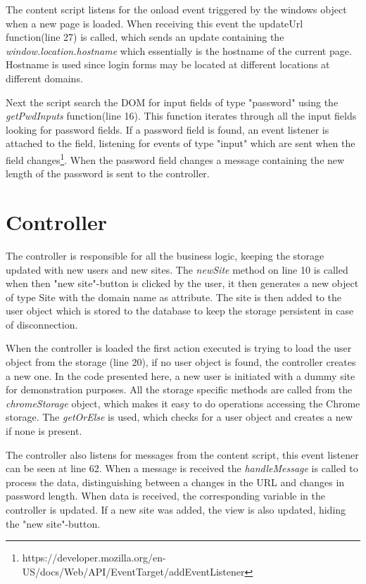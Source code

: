 The content script listens for the onload event triggered by the windows object when a new page is loaded. When receiving this event the updateUrl function(line 27) is called, which sends an update containing the \emph{window.location.hostname} which essentially is the hostname of the current page. Hostname is used since login forms may be located at different locations at different domains.
\par Next the script search the DOM for input fields of type "password" using the \emph{getPwdInputs} function(line 16). This function iterates through all the input fields looking for password fields. If a password field is found, an event listener is attached to the field, listening for events of type "input" which are sent when the field changes\footnote{https://developer.mozilla.org/en-US/docs/Web/API/EventTarget/addEventListener}. When the password field changes a message containing the new length of the password is sent to the controller. 

\section{Controller}\label{app:controller}

The controller is responsible for all the business logic, keeping the storage updated with new users and new sites. The \emph{newSite} method on line 10 is called when then "new site"-button is clicked by the user, it then generates a new object of type Site with the domain name as attribute. The site is then added to the user object which is stored to the database to keep the storage persistent in case of disconnection. 
\par When the controller is loaded the first action executed is trying to load the user object from the storage (line 20), if no user object is found, the controller creates a new one. In the code presented here, a new user is initiated with a dummy site for demonstration purposes. All the storage specific methods are called from the \emph{chromeStorage} object, which makes it easy to do operations accessing the Chrome storage. The \emph{getOrElse} is used, which checks for a user object and creates a new if none is present. 
\par The controller also listens for messages from the content script, this event listener can be seen at line 62. When a message is received the \emph{handleMessage} is called to process the data, distinguishing between a changes in the URL and changes in password length. When data is received, the corresponding variable in the controller is updated. If a new site was added, the view is also updated, hiding the "new site"-button.

